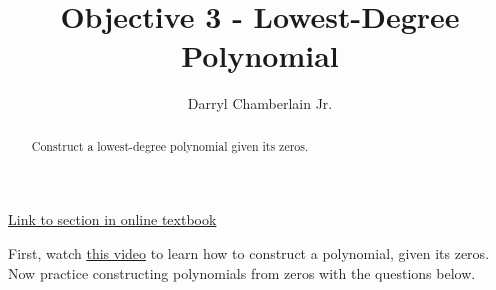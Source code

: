 \documentclass{ximera}
\author{Darryl Chamberlain Jr.}
\title{Objective 3 - Lowest-Degree Polynomial}
\begin{document}
\begin{abstract}
Construct a lowest-degree polynomial given its zeros. 
\end{abstract}
\maketitle

\href{https://cnx.org/contents/mwjClAV_@8.1:G7V9LHif@17/Zeros-of-Polynomial-Functions}{Link to section in online textbook}


First, watch \underline{\href{https://mediasite.video.ufl.edu/Mediasite/Play/11f054fdc9db465fba9fe468237d117f1d}{this video}} to learn how to construct a polynomial, given its zeros. Now practice constructing polynomials from zeros with the questions below.
\end{document}
